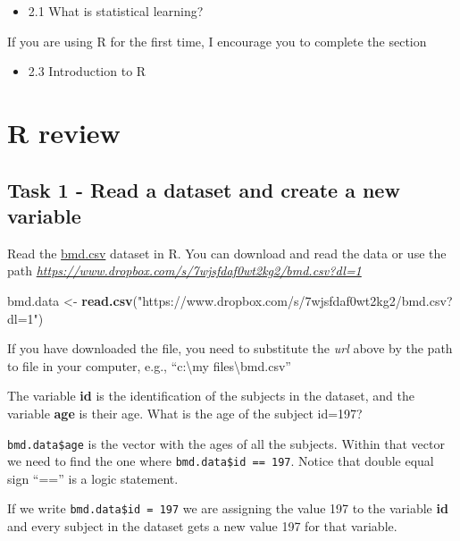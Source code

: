 \documentclass[
]{book}
\newenvironment{Shaded}{\begin{snugshade}}{\end{snugshade}}
\newcommand{\FunctionTok}[1]{\textcolor[rgb]{0.13,0.29,0.53}{\textbf{#1}}}
\newcommand{\NormalTok}[1]{#1}
\newcommand{\OtherTok}[1]{\textcolor[rgb]{0.56,0.35,0.01}{#1}}
\newcommand{\StringTok}[1]{\textcolor[rgb]{0.31,0.60,0.02}{#1}}
\providecommand{\tightlist}{%
  \setlength{\itemsep}{0pt}\setlength{\parskip}{0pt}}
\begin{document}
\begin{itemize}
\tightlist
\item
  2.1 What is statistical learning?
\end{itemize}

If you are using R for the first time, I encourage you to complete the section

\begin{itemize}
\tightlist
\item
  2.3 Introduction to R
\end{itemize}

\section{R review}\label{r-review}

\subsection*{Task 1 - Read a dataset and create a new variable}\label{task-1---read-a-dataset-and-create-a-new-variable}

Read the \href{https://www.dropbox.com/s/7wjsfdaf0wt2kg2/bmd.csv?dl=1}{bmd.csv}
dataset in R. You can download and read the data or use the path \emph{\url{https://www.dropbox.com/s/7wjsfdaf0wt2kg2/bmd.csv?dl=1}}

\begin{Shaded}
\begin{Highlighting}[]
\NormalTok{bmd.data }\OtherTok{\textless{}{-}} \FunctionTok{read.csv}\NormalTok{(}\StringTok{"https://www.dropbox.com/s/7wjsfdaf0wt2kg2/bmd.csv?dl=1"}\NormalTok{)}
\end{Highlighting}
\end{Shaded}

If you have downloaded the file, you need to substitute the \emph{url} above by
the path to file in your computer, e.g., ``c:\textbackslash my files\textbackslash bmd.csv''

The variable \textbf{id} is the identification of the subjects in the dataset, and
the variable \textbf{age} is their age. What is the age of the subject id=197?

\texttt{bmd.data\$age} is the vector with the ages of all the subjects. Within that
vector we need to find the one where \texttt{bmd.data\$id\ ==\ 197}. Notice that double
equal sign ``=='' is a logic statement.

If we write \texttt{bmd.data\$id\ =\ 197} we are
assigning the value 197 to the variable \textbf{id} and every subject in the dataset
gets a new value 197 for that variable.
\end{document}

